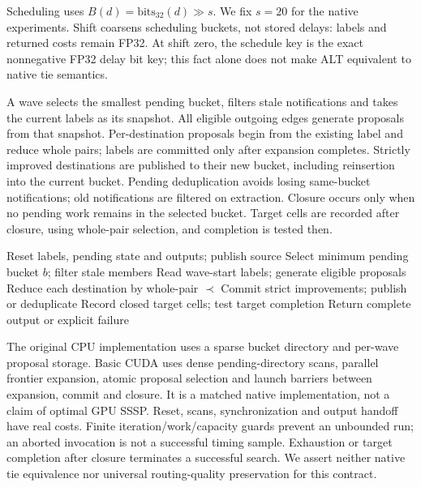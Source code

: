 Scheduling uses $B(d)=\mathrm{bits}_{32}(d)\gg s$. We fix $s=20$ for the native experiments. Shift coarsens scheduling buckets, not stored delays: labels and returned costs remain FP32. At shift zero, the schedule key is the exact nonnegative FP32 delay bit key; this fact alone does not make ALT equivalent to native tie semantics.

A wave selects the smallest pending bucket, filters stale notifications and takes the current labels as its snapshot. All eligible outgoing edges generate proposals from that snapshot. Per-destination proposals begin from the existing label and reduce whole pairs; labels are committed only after expansion completes. Strictly improved destinations are published to their new bucket, including reinsertion into the current bucket. Pending deduplication avoids losing same-bucket notifications; old notifications are filtered on extraction. Closure occurs only when no pending work remains in the selected bucket. Target cells are recorded after closure, using whole-pair selection, and completion is tested then.

\begin{algorithm}[t]\caption{ALT wave contract (one logical sample)}\label{alg:alt}
\begin{algorithmic}[1]
\State Reset labels, pending state and outputs; publish source
\State Select minimum pending bucket $b$; filter stale members
\State Read wave-start labels; generate eligible proposals
\State Reduce each destination by whole-pair $\prec$
\State Commit strict improvements; publish or deduplicate
\State Record closed target cells; test target completion
\EndIf
\EndWhile
\State Return complete output or explicit failure
\end{algorithmic}\end{algorithm}

The original CPU implementation uses a sparse bucket directory and per-wave proposal storage. Basic CUDA uses dense pending-directory scans, parallel frontier expansion, atomic proposal selection and launch barriers between expansion, commit and closure. It is a matched native implementation, not a claim of optimal GPU SSSP. Reset, scans, synchronization and output handoff have real costs. Finite iteration/work/capacity guards prevent an unbounded run; an aborted invocation is not a successful timing sample. Exhaustion or target completion after closure terminates a successful search. We assert neither native tie equivalence nor universal routing-quality preservation for this contract.
